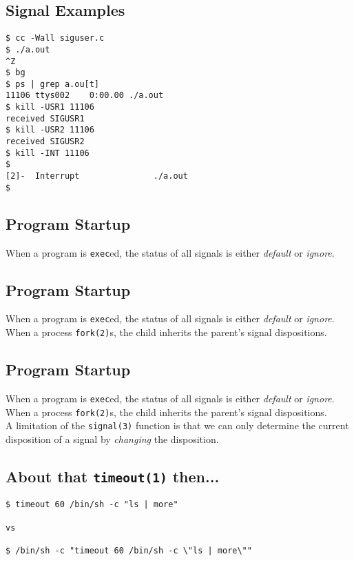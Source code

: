 \documentclass[xga]{xdvislides}
\begin{document}
\subsection{Signal Examples}
\begin{verbatim}
$ cc -Wall siguser.c
$ ./a.out
^Z
$ bg
$ ps | grep a.ou[t]
11106 ttys002    0:00.00 ./a.out
$ kill -USR1 11106
received SIGUSR1
$ kill -USR2 11106
received SIGUSR2
$ kill -INT 11106
$
[2]-  Interrupt               ./a.out
$
\end{verbatim}

\subsection{Program Startup}

When a program is {\tt exec}ed, the status of all signals is either {\em
default} or {\em ignore}.

\subsection{Program Startup}

When a program is {\tt exec}ed, the status of all signals is either {\em
default} or {\em ignore}.
\\

When a process {\tt fork(2)}s, the child inherits the parent's signal
dispositions.

\subsection{Program Startup}

When a program is {\tt exec}ed, the status of all signals is either {\em
default} or {\em ignore}.
\\

When a process {\tt fork(2)}s, the child inherits the parent's signal
dispositions.
\\

A limitation of the {\tt signal(3)} function is that we can only determine the
current disposition of a signal by {\em changing} the disposition.


\subsection{About that {\tt timeout(1)} then...}
\begin{verbatim}
$ timeout 60 /bin/sh -c "ls | more"

vs

$ /bin/sh -c "timeout 60 /bin/sh -c \"ls | more\""
\end{verbatim}
\end{document}
